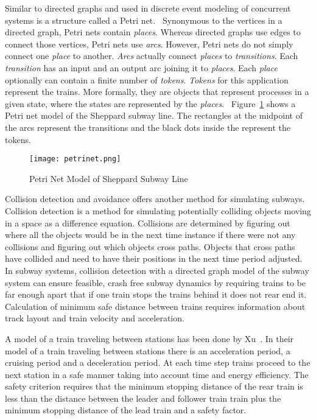 Similar to directed graphs and used in discrete event modeling of concurrent
systems is a structure called a Petri net.~\cite{Petri62}  Synonymous to the
vertices in a directed graph, Petri nets contain \textit{places}.  Whereas
directed graphs use edges to connect those vertices, Petri nets use
\textit{arcs}. However, Petri nets do not simply connect one \textit{place} to
another.  \textit{Arcs} actually connect \textit{places} to
\textit{transitions}. Each \textit{transition} has an input and an output arc
joining it to \textit{places}.  Each \textit{place} optionally can contain a
finite number of \textit{tokens}.  \textit{Tokens} for this application
represent the trains.  More formally, they are objects that represent processes
in a given state, where the states are represented by the
\textit{places}.~\cite{Kristoffersen2003}  Figure~\ref{fig:petrinet} shows a
Petri net model of the Sheppard subway line. The rectangles at the midpoint of
the arcs represent the transitions and the black dots inside the represent the
tokens.
%
\begin{figure}[htb]
	\centering
	\texttt{[image: petrinet.png]}
	\caption{Petri Net Model of Sheppard Subway Line}\label{fig:petrinet}
\end{figure}
%

Collision detection and avoidance offers another method for simulating subways.
Collision detection is a method for simulating potentially colliding objects
moving in a space as a difference equation. Collisions are determined by
figuring out where all the objects would be in the next time instance if there
were not any collisions and figuring out which objects cross paths. Objects that
cross paths have collided and need to have their positions in the next time
period adjusted. In subway systems, collision detection with a directed graph model of the subway system can ensure feasible, crash free subway dynamics by requiring trains to be far enough apart that if one train stops the trains behind it does not rear end it. Calculation of minimum safe distance between trains requires information
about track layout and train velocity and acceleration. 

A model of a train traveling between stations has been done by Xu~\cite{Xu2014}. In their model of a train traveling between stations there is an acceleration period, a cruising period and a deceleration period. At each time step trains proceed to the next station in a safe manner taking into account time and energy efficiency. The safety criterion requires that the minimum stopping distance of the rear train is less than the distance between the leader and follower train train plus the minimum stopping distance of the lead train and a safety factor. 

